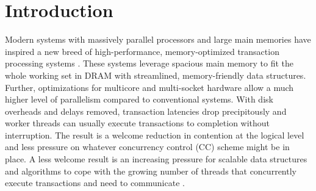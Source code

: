 
\section{Introduction}

Modern systems with massively parallel processors and large main memories have inspired a new breed of high-performance, memory-optimized transaction processing systems \cite{Kallman+08,PandisJHA10,KemperN11,LarsonBDFPZ11,LevandoskiLSSW15,TuZKLM13}. These systems leverage spacious main memory to fit the whole working set in DRAM with streamlined, memory-friendly data structures. Further, optimizations for multicore and multi-socket hardware allow a much higher level of parallelism compared to conventional systems. With disk overheads and delays removed, transaction latencies drop precipitously and worker threads can usually execute transactions to completion without interruption. The result is a welcome reduction in contention at the logical level and less pressure on whatever concurrency control (CC) scheme might be in place. A less welcome result is an increasing pressure for scalable data structures and algorithms to cope with the growing number of threads that concurrently execute transactions and need to communicate \cite{JohnsonPA13}.


